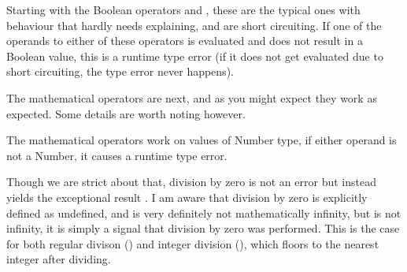 Starting with the Boolean operators  and , these are the typical
ones with behaviour that hardly needs explaining, and are short circuiting. If
one of the operands to either of these operators is evaluated and does not result
in a Boolean value, this is a runtime type error (if it does not get evaluated
due to short circuiting, the type error never happens).

\begin{prooftree}
\end{prooftree}

\begin{prooftree}
\end{prooftree}

\begin{prooftree}
\end{prooftree}

\begin{prooftree}
\end{prooftree}

\begin{prooftree}
\end{prooftree}

\begin{prooftree}
\end{prooftree}

The mathematical operators are next, and as you might expect they work
as expected. Some details are worth noting however.

The mathematical operators work on values of Number type, if either operand
is not a Number, it causes a runtime type error.

Though we are strict about that, division by zero is not an error but instead
yields the exceptional result . I am aware that division by zero is
explicitly defined as undefined, and is very definitely not mathematically
infinity, but  is not infinity, it is simply a signal that division
by zero was performed. This is the case for both regular divison (\op{/}) and
integer division (\op{//}), which floors to the nearest integer after dividing.

